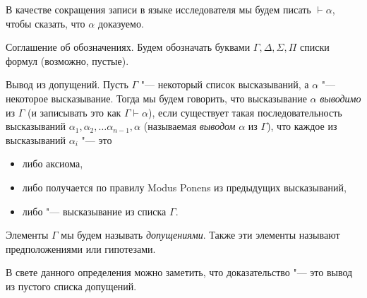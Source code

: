 В качестве сокращения записи в языке исследователя мы будем писать $\vdash \alpha$,
чтобы сказать, что $\alpha$ доказуемо.

Соглашение об обозначениях. Будем обозначать буквами 
$\Gamma, \Delta, \Sigma, \Pi$ списки формул (возможно, пустые).

\begin{definition}{Вывод из допущений.}
Пусть $\Gamma$ "--- некоторый список высказываний, а $\alpha$ "--- 
некоторое высказывание. 
Тогда мы будем говорить, что высказывание $\alpha$ \emph{выводимо} из $\Gamma$ 
(и записывать это как $\Gamma \vdash \alpha$), если существует такая 
последовательность высказываний $\alpha_1, \alpha_2, \dots \alpha_{n-1}, \alpha$
(называемая \emph{выводом} $\alpha$ из $\Gamma$), 
что каждое из высказываний $\alpha_i$ "--- это 
\begin{itemize}
\item либо аксиома,

\item либо получается по правилу Modus Ponens из предыдущих высказываний, 
\item либо "--- высказывание из списка $\Gamma$.
\end{itemize}
Элементы $\Gamma$ мы будем называть \emph{допущениями}. Также эти элементы
называют предположениями или гипотезами. 
\end{definition}

В свете данного определения можно заметить, что доказательство "--- это
вывод из пустого списка допущений. 
